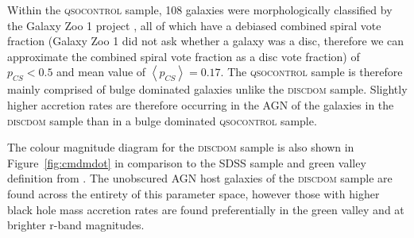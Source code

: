 {Within the \textsc{qsocontrol} sample, 108 galaxies were morphologically classified by the Galaxy Zoo 1 project \cite{lintott08, Lintott11}, all of which have a debiased combined spiral vote fraction (Galaxy Zoo 1 did not ask whether a galaxy was a disc, therefore we can approximate the combined spiral vote fraction as a disc vote fraction) of $p_{CS} < 0.5$ and mean value of $\left<p_{CS} \right> = 0.17$.  The \textsc{qsocontrol} sample is therefore mainly comprised of bulge dominated galaxies unlike the \textsc{discdom} sample. Slightly higher accretion rates are therefore occurring in the AGN of the galaxies in the \textsc{discdom} sample than in a bulge dominated \textsc{qsocontrol} sample. 

The colour magnitude diagram for the \textsc{discdom} sample is also shown in Figure~\ref{fig:cmdmdot} in comparison to the SDSS sample and green valley definition from \citet{Baldry04}. The unobscured AGN host galaxies of the \textsc{discdom} sample are found across the entirety of this parameter space, however those with higher black hole mass accretion rates are found preferentially in the green valley and at brighter r-band magnitudes. 

}
